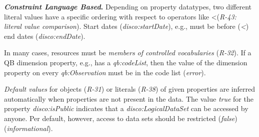 \documentclass[conference]{IEEEtran}
\begin{document}

\textbf{\emph{Constraint Language Based}.}
Depending on property datatypes, two different literal values have
a specific ordering with respect to operators like \textless  (\emph{R-43: literal value comparison}).
Start dates (\emph{disco:startDate}), e.g., must be before (\emph{\textless}) end dates (\emph{disco:endDate}).


In many cases, resources must be \emph{members of controlled vocabularies} (\emph{R-32}).
If a QB dimension property, e.g., has a \emph{qb:codeList},
then the value of the dimension property on every \emph{qb:Observation} must be in the code list (\emph{error}).

\emph{Default values} for objects (\emph{R-31}) or literals (\emph{R-38}) of given properties are inferred automatically when properties are not present in the data.
The value \emph{true} for the property {\em disco:isPublic} indicates that a {\em disco:LogicalDataSet} can be accessed by anyone.
Per default, however, access to data sets should be restricted (\emph{false}) (\emph{informational}).
\end{document}
